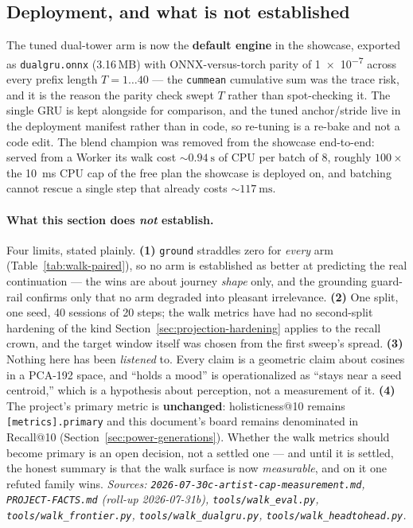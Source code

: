 \documentclass[11pt]{article}
\begin{document}
\subsection{Deployment, and what is not established}
\label{sec:walk-limits}
The tuned dual-tower arm is now the \textbf{default engine} in the showcase,
exported as \texttt{dualgru.onnx} (\num{3.16}\,MB) with ONNX-versus-torch
parity of \num{1e-7} across every prefix length $T = 1\ldots40$ --- the
\texttt{cummean} cumulative sum was the trace risk, and it is the reason the
parity check swept $T$ rather than spot-checking it. The single GRU is kept
alongside for comparison, and the tuned anchor/stride live in the deployment
manifest rather than in code, so re-tuning is a re-bake and not a code edit. The
blend champion was removed from the showcase end-to-end: served from a Worker
its walk cost ${\sim}\SI{0.94}{\second}$ of CPU per batch of 8, roughly
$100\times$ the \SI{10}{\milli\second} CPU cap of the free plan the showcase is
deployed on, and batching cannot rescue a single step that already costs
${\sim}\SI{117}{\milli\second}$.

\paragraph{What this section does \emph{not} establish.} Four limits, stated
plainly. \textbf{(1)} \texttt{ground} straddles zero for \emph{every} arm
(Table~\ref{tab:walk-paired}), so no arm is established as better at predicting
the real continuation --- the wins are about journey \emph{shape} only, and the
grounding guard-rail confirms only that no arm degraded into pleasant
irrelevance. \textbf{(2)} One split, one seed, \num{40} sessions of \num{20}
steps; the walk metrics have had no second-split hardening of the kind
Section~\ref{sec:projection-hardening} applies to the recall crown, and the
target window itself was chosen from the first sweep's spread. \textbf{(3)}
Nothing here has been \emph{listened} to. Every claim is a geometric claim about
cosines in a PCA-192 space, and ``holds a mood'' is operationalized as
``stays near a seed centroid,'' which is a hypothesis about perception, not a
measurement of it. \textbf{(4)} The project's primary metric is
\textbf{unchanged}: holisticness@10 remains \texttt{[metrics].primary} and this
document's board remains denominated in Recall@10
(Section~\ref{sec:power-generations}). Whether the walk metrics should become
primary is an open decision, not a settled one --- and until it is settled, the
honest summary is that the walk surface is now \emph{measurable}, and on it one
refuted family wins.
\emph{Sources: \texttt{2026-07-30c-artist-cap-measurement.md},
\texttt{PROJECT-FACTS.md} (roll-up 2026-07-31b),
\texttt{tools/walk\_eval.py}, \texttt{tools/walk\_frontier.py},
\texttt{tools/walk\_dualgru.py}, \texttt{tools/walk\_headtohead.py}.}
\end{document}
